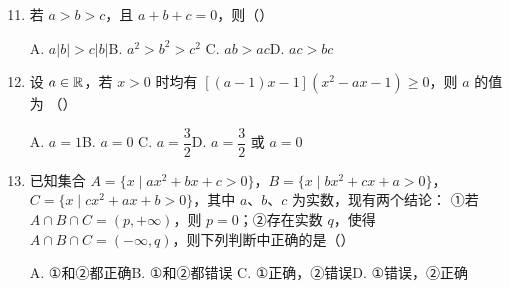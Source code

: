 \documentclass[a4paper,11pt]{article}
\begin{document}
\begin{enumerate}
\setcounter{enumi}{10}

\item 若 $a>b>c$，且 $a+b+c=0$，则\mbox{（\quad）}

\keepwithprev
A. $a|b|>c|b|$\qquad B. $a^2>b^2>c^2$\qquad
C. $ab>ac$\qquad D. $ac>bc$


\item 设 $a\in\mathbb{R}$，若 $x>0$ 时均有 $[(a-1)x-1](x^2-ax-1)\geqslant0$，则 $a$ 的值为
\mbox{（\quad）}

\keepwithprev
A. $a=1$\qquad B. $a=0$\qquad
C. $a=\dfrac32$\qquad D. $a=\dfrac32$ 或 $a=0$


\item 已知集合 $A=\{x\mid ax^2+bx+c>0\}$，$B=\{x\mid bx^2+cx+a>0\}$，
$C=\{x\mid cx^2+ax+b>0\}$，其中 $a$、$b$、$c$ 为实数，现有两个结论：
①若 $A\cap B\cap C=(p,+\infty)$，则 $p=0$；②存在实数 $q$，使得
$A\cap B\cap C=(-\infty,q)$，则下列判断中正确的是\mbox{（\quad）}

\keepwithprev
A. ①和②都正确\qquad B. ①和②都错误\qquad
C. ①正确，②错误\qquad D. ①错误，②正确



\end{enumerate}
\end{document}
